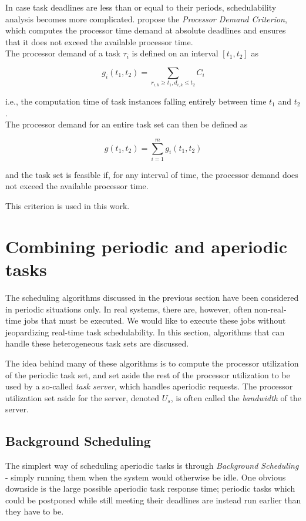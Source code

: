\documentclass[twoside]{uva-inf-bachelor-thesis}
\begin{document}
In case task deadlines are less than or equal to their periods, schedulability analysis becomes more complicated. \textcite{Baruah1990} propose the \emph{Processor Demand Criterion}, which computes the processor time demand at absolute deadlines and ensures that it does not exceed the available processor time.\\

\noindent The processor demand of a task $\tau_i$ is defined on an interval $[t_1, t_2]$ as

\[ g_i(t_1, t_2) = \sum_{r_{i,k} \ge t_1, d_{i,k} \le t_2} C_i \]

\noindent i.e., the computation time of task instances falling entirely between time $t_1$ and $t_2$.\\

\noindent The processor demand for an entire task set can then be defined as

\[ g(t_1, t_2) = \sum_{i=1}^m g_i(t_1, t_2) \]

\noindent and the task set is feasible if, for any interval of time, the processor demand does not exceed the available processor time.

This criterion is used in this work.

\section{Combining periodic and aperiodic tasks}
The scheduling algorithms discussed in the previous section have been considered in periodic situations only. In real systems, there are, however, often non-real-time jobs that must be executed. We would like to execute these jobs without jeopardizing real-time task schedulability. In this section, algorithms that can handle these heterogeneous task sets are discussed.

The idea behind many of these algorithms is to compute the processor utilization of the periodic task set, and set aside the rest of the processor utilization to be used by a so-called \emph{task server}, which handles aperiodic requests. The processor utilization set aside for the server, denoted $U_s$, is often called the \emph{bandwidth} of the server.

\subsection{Background Scheduling}
The simplest way of scheduling aperiodic tasks is through \emph{Background Scheduling} - simply running them when the system would otherwise be idle. One obvious downside is the large possible aperiodic task response time; periodic tasks which could be postponed while still meeting their deadlines are instead run earlier than they have to be.
\end{document}
